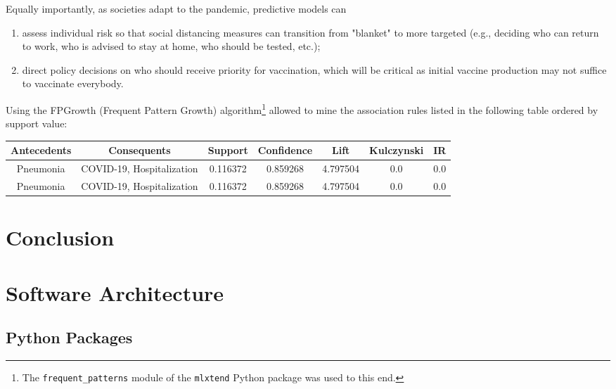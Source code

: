\documentclass[11pt,a4paper]{article}
\begin{document}
Equally importantly, as societies adapt to the pandemic, predictive models can
\begin{enumerate}
    \item assess individual risk so that social distancing measures can
    transition from "blanket" to more targeted (e.g., deciding who can return to
    work, who is advised to stay at home, who should be tested, etc.);
    \item direct policy decisions on who should receive priority for
    vaccination, which will be critical as initial vaccine production may not
    suffice to vaccinate everybody.
\end{enumerate}
Using the FPGrowth (Frequent Pattern Growth) algorithm\footnote{The
\texttt{frequent\_patterns} module of the \texttt{mlxtend} Python package was
used to this end.} allowed to mine the association rules listed in the following
table ordered by support value:
\begin{center}
\hspace*{-1cm}
\begin{tabular}{ | c | c | c | c | c | c | c | }
    \rowcolor{gray!50}
    \hline
    Antecedents & Consequents & Support & Confidence & Lift & Kulczynski & IR\\
    \hline
    Pneumonia & COVID-19, Hospitalization & 0.116372 & 0.859268 & 4.797504 & 0.0 & 0.0\\
    \hline
    Pneumonia & COVID-19, Hospitalization & 0.116372 & 0.859268 & 4.797504 & 0.0 & 0.0\\
    \hline
\end{tabular}
\end{center}
\newpage
\section{Conclusion}

\newpage
\section{Software Architecture}
\subsection{Python Packages}
\end{document}
